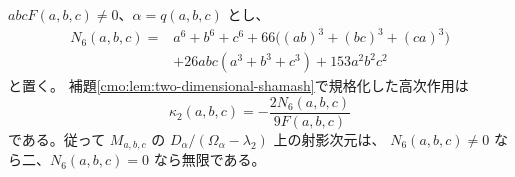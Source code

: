 \begin{proposition}[二次元加群の普遍な高次作用]
\label{cmo:prop:two-dimensional-universal-kappa}
$abcF(a,b,c)\ne0$、$\alpha=q(a,b,c)$ とし、
\begin{equation}\label{cmo:eq:two-dimensional-sextic}
 \begin{split}
 N_6(a,b,c)={}&a^6+b^6+c^6
   +66\bigl((ab)^3+(bc)^3+(ca)^3\bigr)\\
 &+26abc(a^3+b^3+c^3)+153a^2b^2c^2
 \end{split}
\end{equation}
と置く。
補題\ref{cmo:lem:two-dimensional-shamash}で規格化した高次作用は
\begin{equation}\label{cmo:eq:two-dimensional-universal-kappa}
 \boxed{\displaystyle
 \kappa_2(a,b,c)=-\frac{2N_6(a,b,c)}{9F(a,b,c)}}
\end{equation}
である。従って $M_{a,b,c}$ の
$D_\alpha/(\Omega_\alpha-\lambda_2)$ 上の射影次元は、
$N_6(a,b,c)\ne0$ なら二、$N_6(a,b,c)=0$ なら無限である。
\end{proposition}

